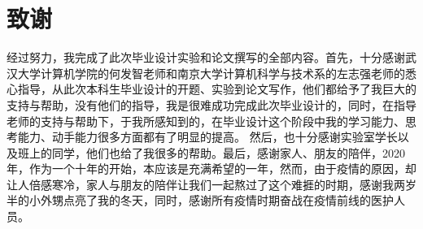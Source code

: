 
\clearpage
{}
{}

\chapter*{致谢}
经过努力，我完成了此次毕业设计实验和论文撰写的全部内容。首先，十分感谢武汉大学计算机学院的何发智老师和南京大学计算机科学与技术系的左志强老师的悉心指导，从此次本科生毕业设计的开题、实验到论文写作，他们都给予了我巨大的支持与帮助，没有他们的指导，我是很难成功完成此次毕业设计的，同时，在指导老师的支持与帮助下，于我所感知到的，在毕业设计这个阶段中我的学习能力、思考能力、动手能力很多方面都有了明显的提高。
然后，也十分感谢实验室学长以及班上的同学，他们也给了我很多的帮助。最后，感谢家人、朋友的陪伴，2020年，作为一个十年的开始，本应该是充满希望的一年，然而，由于疫情的原因，却让人倍感寒冷，家人与朋友的陪伴让我们一起熬过了这个难捱的时期，感谢我两岁半的小外甥点亮了我的冬天，同时，感谢所有疫情时期奋战在疫情前线的医护人员。